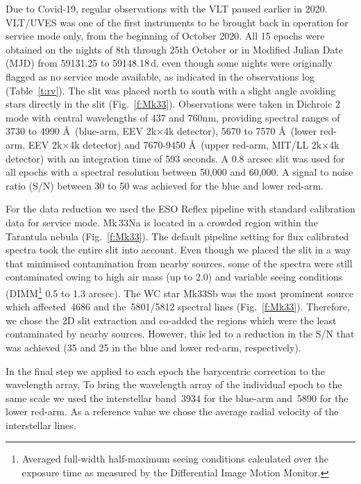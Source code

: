 \documentclass[fleqn,usenatbib]{mnras}
\begin{document}
Due to Covid-19, regular observations with the VLT paused earlier in 2020. VLT/UVES was one of the first instruments to be brought back in operation for service mode only, from the beginning of October 2020. All 15 epochs were obtained on the nights of 8th through 25th October or in Modified Julian Date (MJD) from 59131.25 to 59148.18\,d, even though some nights were originally flagged as no service mode available, as indicated in the observations log (Table~\ref{t:rv}). The slit was placed north to south with a slight angle avoiding stars directly in the slit (Fig.~\ref{f:Mk33}). Observations were taken in Dichroic 2 mode with central wavelengths of 437 and 760nm, providing spectral ranges of 3730 to 4990 \AA\ (blue-arm, EEV 2k$\times$4k detector), 5670 to 7570 \AA\ (lower red-arm, EEV 2k$\times$4k detector) and 7670-9450 \AA\ (upper red-arm, MIT/LL 2k$\times$4k detector) with an integration time of 593 seconds. A 0.8 arcsec slit was used for all epochs with a spectral resolution between 50,000 and 60,000. A signal to noise ratio (S/N) between 30 to 50 was achieved for the blue and lower red-arm.

For the data reduction we used the ESO Reflex pipeline \citep{freudling2013} with standard calibration data for service mode. Mk\,33Na is located in a crowded region within the Tarantula nebula (Fig.~\ref{f:Mk33}). The default pipeline setting for flux calibrated spectra took the entire slit into account. Even though we placed the slit in a way that minimised contamination from nearby sources, some of the spectra were still contaminated owing to high air mass (up to 2.0) and variable seeing conditions (DIMM\footnote{Averaged full-width half-maximum seeing conditions calculated over the exposure time as measured by the Differential Image Motion Monitor.} 0.5 to 1.3 arcsec). The WC star Mk33Sb was the most prominent source which affected \,4686 and the \,5801/5812 spectral lines (Fig.~\ref{f:Mk33}). Therefore, we chose the 2D slit extraction and co-added the regions which were the least contaminated by nearby sources. However, this led to a reduction in the S/N that was achieved (35 and 25 in the blue and lower red-arm, respectively).

In the final step we applied to each epoch the barycentric correction to the wavelength array. To bring the wavelength array of the individual epoch to the same scale we used the  interstellar band \,3934 for the blue-arm and \,5890 for the lower red-arm. As a reference value we chose the average radial velocity of the interstellar lines.
\end{document}
